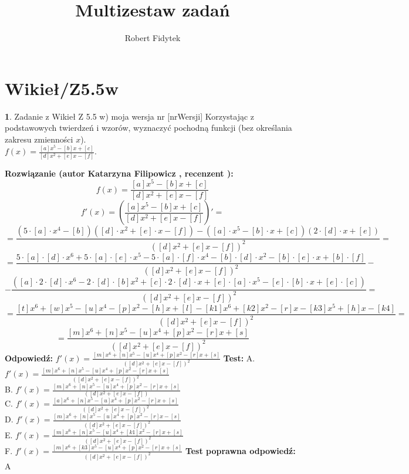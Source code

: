 \documentclass[12pt, a4paper]{article}
\title{Multizestaw zadań}
\author{Robert Fidytek}
\date{}
\theoremstyle{definition} %
\newtheorem{zad}{}
\newcommand{\kategoria}[1]{\section{#1}} %
\newcommand{\zadStart}[1]{\begin{zad}#1\newline} %
\newcommand{\zadStop}{\end{zad}}   %
\newcommand{\rozwStart}[2]{\noindent \textbf{Rozwiązanie (autor #1 , recenzent #2): }\newline} %
\newcommand{\rozwStop}{\newline}                                            %
\newcommand{\odpStart}{\noindent \textbf{Odpowiedź:}\newline}    %
\newcommand{\odpStop}{\newline}                                             %
\newcommand{\testStart}{\noindent \textbf{Test:}\newline} %
\newcommand{\testStop}{\newline} %
\newcommand{\kluczStart}{\noindent \textbf{Test poprawna odpowiedź:}\newline} %
\newcommand{\kluczStop}{\newline} %
\begin{document}
\maketitle


\kategoria{Wikieł/Z5.5w}
\zadStart{Zadanie z Wikieł Z 5.5 w) moja wersja nr [nrWersji]}
Korzystając z podstawowych twierdzeń i wzorów, wyznaczyć pochodną funkcji (bez określania zakresu zmienności $x$).\\ 
$f(x)=\frac{[a]x^5-[b]x+[c]}{[d]x^2+[e]x-[f]}$.
\zadStop
\rozwStart{Katarzyna Filipowicz}{}
$$f(x)=\frac{[a]x^5-[b]x+[c]}{[d]x^2+[e]x-[f]}$$
$$f'(x)=\left(\frac{[a]x^5-[b]x+[c]}{[d]x^2+[e]x-[f]}\right)' = $$
$$ =\frac{(5\cdot [a]\cdot x^4-[b])([d]\cdot x^2+[e]\cdot x-[f])-([a]\cdot x^5-[b]\cdot x+[c])(2\cdot [d]\cdot x+[e])}{([d]x^2+[e]x-[f])^2}=
$$ $$
=\frac{5\cdot [a]\cdot [d]\cdot x^6+5\cdot [a]\cdot [e]\cdot x^5-5\cdot [a]\cdot [f]\cdot x^4-[b]\cdot [d]\cdot x^2-[b]\cdot [e]\cdot x+[b]\cdot [f]}{([d]x^2+[e]x-[f])^2}-
$$ $$
-\frac{([a]\cdot 2\cdot [d]\cdot x^6-2\cdot[d]\cdot [b]x^2+[c]\cdot 2\cdot [d]\cdot x+[e]\cdot [a]\cdot x^5-[e]\cdot [b]\cdot x+[e]\cdot [c])}{([d]x^2+[e]x-[f])^2}=
$$ $$
=\frac{[t] x^6+[w] x^5-[u] x^4-[p] x^2-[h] x+[l]-[k1] x^6+[k2] x^2-[r] x-[k3] x^5+[h] x-[k4]}{([d]x^2+[e]x-[f])^2}=
$$ $$
=\frac{[m]x^6+[n]x^5-[u]x^4+[p]x^2-[r]x+[s]}{([d]x^2+[e]x-[f])^2}
$$
\rozwStop
\odpStart
$ f'(x)=\frac{[m]x^6+[n]x^5-[u]x^4+[p]x^2-[r]x+[s]}{([d]x^2+[e]x-[f])^2}$
\odpStop
\testStart
A. $ f'(x)=\frac{[m]x^6+[n]x^5-[u]x^4+[p]x^2-[r]x+[s]}{([d]x^2+[e]x-[f])^2}$\\
B. $ f'(x)=\frac{[m]x^6+[n]x^5-[u]x^4+[p]x^2-[r]x+[s]}{([d]x^2+[e]x-[f])}$\\
C. $ f'(x)=\frac{[a]x^6+[n]x^5-[u]x^4+[p]x^2-[r]x+[s]}{([d]x^2+[e]x-[f])^2}$ \\
D. $ f'(x)=\frac{[m]x^6+[n]x^5-[u]x^4+[p]x^2-[r]x-[s]}{([d]x^2+[e]x-[f])^2}$\\
E. $ f'(x)=\frac{[m]x^6+[n]x^5-[u]x^4+[k1]x^2-[r]x+[s]}{([d]x^2+[e]x-[f])^2}$\\
F. $ f'(x)=\frac{[m]x^6+[k3]x^5-[u]x^4+[p]x^2-[r]x+[s]}{([d]x^2+[e]x-[f])^2}$
\testStop
\kluczStart
A
\kluczStop
\end{document}
